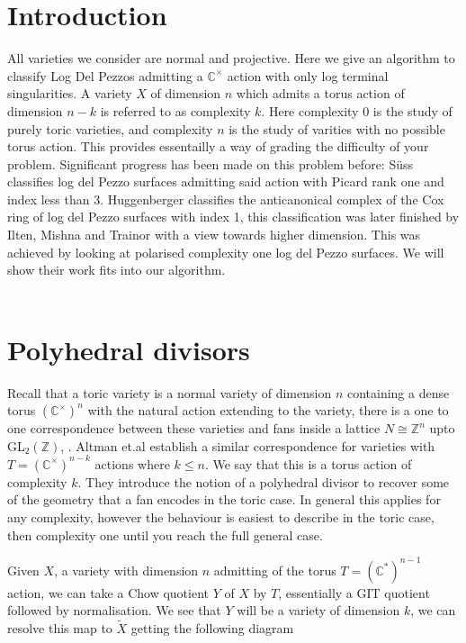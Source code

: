 \documentclass[12pt]{amsart}
\theoremstyle{plain}
\newcommand{\C}[1]{(\mathbb{C}^\times)^#1}
\begin{document}
 


\section{Introduction}

All varieties we consider are normal and projective. Here we give an algorithm to classify Log Del Pezzos admitting a $\mathbb{C}^\times$ action with only log terminal singularities. A variety $X$ of dimension $n$ which admits a torus action of dimension $n-k$ is referred to as complexity $k$. Here complexity 0 is the study of purely toric varieties, and complexity $n$ is the study of varities with no possible torus action. This provides essentailly a way of grading the difficulty of your problem. Significant progress has been made on this problem before: S\"{u}ss \cite{Suss} classifies log del Pezzo surfaces admitting said action with Picard rank one and index less than 3. Huggenberger \cite{Huggenberger} classifies the anticanonical complex of the Cox ring of log del Pezzo surfaces with index 1, this classification was later finished by Ilten, Mishna and Trainor \cite{IMT} with a view towards higher dimension. This was achieved by looking at polarised complexity one log del Pezzo surfaces. We will show their work fits into our algorithm. 
\\
\\
\section{Polyhedral divisors}
Recall that a toric variety is a  normal variety of dimension $n$ containing a dense torus $\C{n}$ with the natural action extending to the variety, there is a one to one correspondence between these varieties and fans inside a lattice $N \cong \mathbb{Z}^n$ upto GL$_2(\mathbb{Z})$, \cite{Cox}.
Altman et.al \cite{Altmann} establish a similar correspondence for varieties with $T = \C{{ n-k}}$ actions where $k \leq n$. We say that this is a torus action of complexity $k$. They introduce the notion of a polyhedral divisor to recover some of the geometry that a fan encodes in the toric case. In general this applies for any complexity, however the behaviour is easiest to describe in the toric case, then complexity one until you reach the full general case.


Given $X$, a variety with dimension $n$ admitting of the torus $ T = (\mathbb{C}^*)^{n-1}$ action, we can take a Chow quotient $Y$ of $X$ by $T$, essentially a GIT quotient followed by normalisation.  We see that $Y$ will be a variety of dimension $k$, we can resolve this map to $\tilde{X}$ getting the following diagram
\end{document}
